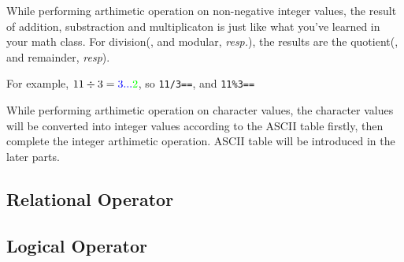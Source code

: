 \documentclass{report}
\begin{document}
    While performing arthimetic operation on non-negative integer values, the result of addition, substraction and multiplicaton is just like what you've learned in your math class. For division(, and modular, \textit{resp.}), the results are the quotient(, and remainder, \textit{resp}).

    For example, $11\div3=\color{blue}{3}...\color{green}{2}$, so \texttt{11/3==\color{blue}{3}}, and \texttt{11\%3==\color{green}{2}}

    While performing arthimetic operation on character values, the character values will be converted into integer values according to the ASCII table firstly, then complete the integer arthimetic operation. ASCII table will be introduced in the later parts.

    \subsection{Relational Operator}
    \subsection{Logical Operator}
    
\end{document}
